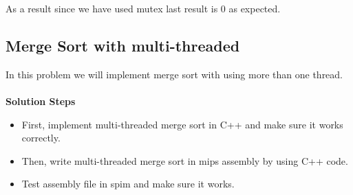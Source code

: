 \documentclass{article}
\begin{document}
\begin{figure}[H]
\end{figure} 
As a result since we have used mutex last result is 0 as expected.
\cleardoublepage
\subsection{Merge Sort with multi-threaded}
In this problem we will implement merge sort with using more than one thread. \\ \\
\textbf{Solution Steps}
\begin{itemize}
	\item First, implement multi-threaded merge sort in C++ and make sure it works correctly.
	\item Then, write multi-threaded merge sort in mips assembly by using C++ code.
	\item Test assembly file in spim and make sure it works.
\end{itemize}
\end{document}
